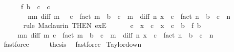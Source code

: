 \begin{isabellebody}
\ \ \ \ \ \ f\ {\isacharparenleft}{\kern0pt}b\ {\isacharminus}{\kern0pt}\ c\ {\isacharplus}{\kern0pt}\ c{\isacharparenright}{\kern0pt}\ {\isacharequal}{\kern0pt}\isanewline
\ \ \ \ \ \ \ \ {\isacharparenleft}{\kern0pt}{\isasymSum}m{\isacharless}{\kern0pt}n{\isachardot}{\kern0pt}\ diff\ m\ {\isacharparenleft}{\kern0pt}{}\ {\isacharplus}{\kern0pt}\ c{\isacharparenright}{\kern0pt}\ {\isacharslash}{\kern0pt}\ fact\ m\ {\isacharasterisk}{\kern0pt}\ {\isacharparenleft}{\kern0pt}b\ {\isacharminus}{\kern0pt}\ c{\isacharparenright}{\kern0pt}\ {\isacharcircum}{\kern0pt}\ m{\isacharparenright}{\kern0pt}\ {\isacharplus}{\kern0pt}\ diff\ n\ {\isacharparenleft}{\kern0pt}x\ {\isacharplus}{\kern0pt}\ c{\isacharparenright}{\kern0pt}\ {\isacharslash}{\kern0pt}\ fact\ n\ {\isacharasterisk}{\kern0pt}\ {\isacharparenleft}{\kern0pt}b\ {\isacharminus}{\kern0pt}\ c{\isacharparenright}{\kern0pt}\ {\isacharcircum}{\kern0pt}\ n{\isachardoublequoteclose}\isanewline
\ \ \ \ \ \isamarkupfalse%
\ {\isacharparenleft}{\kern0pt}rule\ Maclaurin\ {\isacharbrackleft}{\kern0pt}THEN\ exE{\isacharbrackright}{\kern0pt}{\isacharparenright}{\kern0pt}\isanewline
\ \ \ \isamarkupfalse%
\ \isamarkupfalse%
\ {\isachardoublequoteopen}c\ {\isacharless}{\kern0pt}\ x\ {\isacharplus}{\kern0pt}\ c\ {\isasymand}\ x\ {\isacharplus}{\kern0pt}\ c\ {\isacharless}{\kern0pt}\ b\ {\isasymand}\ f\ b\ {\isacharequal}{\kern0pt}\isanewline
\ \ \ \ \ {\isacharparenleft}{\kern0pt}{\isasymSum}m{\isacharless}{\kern0pt}n{\isachardot}{\kern0pt}\ diff\ m\ c\ {\isacharslash}{\kern0pt}\ fact\ m\ {\isacharasterisk}{\kern0pt}\ {\isacharparenleft}{\kern0pt}b\ {\isacharminus}{\kern0pt}\ c{\isacharparenright}{\kern0pt}\ {\isacharcircum}{\kern0pt}\ m{\isacharparenright}{\kern0pt}\ {\isacharplus}{\kern0pt}\ diff\ n\ {\isacharparenleft}{\kern0pt}x\ {\isacharplus}{\kern0pt}\ c{\isacharparenright}{\kern0pt}\ {\isacharslash}{\kern0pt}\ fact\ n\ {\isacharasterisk}{\kern0pt}\ {\isacharparenleft}{\kern0pt}b\ {\isacharminus}{\kern0pt}\ c{\isacharparenright}{\kern0pt}\ {\isacharcircum}{\kern0pt}\ n{\isachardoublequoteclose}\isanewline
\ \ \ \ \isamarkupfalse%
\ fastforce\isanewline
\ \ \isamarkupfalse%
\ \isamarkupfalse%
\ {\isacharquery}{\kern0pt}thesis\ \isamarkupfalse%
\ fastforce\isanewline
{}\isamarkupfalse%
%
\endisatagproof
{\isafoldproof}%
%
\isadelimproof
\isanewline
%
\endisadelimproof
\isanewline
{}\isamarkupfalse%
\ Taylor{\isacharunderscore}{\kern0pt}down{\isacharcolon}{\kern0pt}\isanewline

\end{isabellebody}
